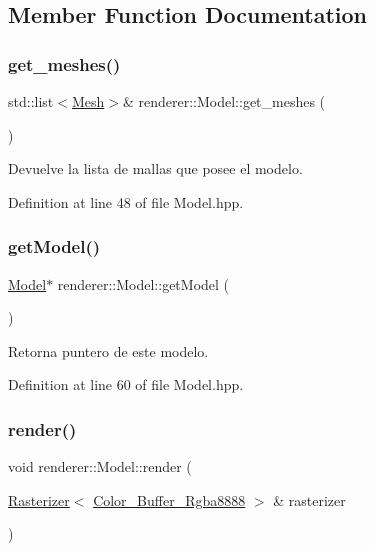 \subsection{Member Function Documentation}
\mbox{\label{classrenderer_1_1_model_a88df819cc280f518023364c9181aff64}} 
\subsubsection{\texorpdfstring{get\_meshes()}{get\_meshes()}}
{\footnotesize\ttfamily std\+::list$<$\mbox{\hyperlink{classrenderer_1_1_mesh}{Mesh}}$>$\& renderer\+::\+Model\+::get\+\_\+meshes (\begin{DoxyParamCaption}{ }\end{DoxyParamCaption})\hspace{0.3cm}{\ttfamily [inline]}}

Devuelve la lista de mallas que posee el modelo. 

Definition at line 48 of file Model.\+hpp.

\mbox{\label{classrenderer_1_1_model_a2e81d98304670f47465b18010ec342cb}} 
\subsubsection{\texorpdfstring{getModel()}{getModel()}}
{\footnotesize\ttfamily \mbox{\hyperlink{classrenderer_1_1_model}{Model}}$\ast$ renderer\+::\+Model\+::get\+Model (\begin{DoxyParamCaption}{ }\end{DoxyParamCaption})\hspace{0.3cm}{\ttfamily [inline]}}

Retorna puntero de este modelo. 

Definition at line 60 of file Model.\+hpp.

\mbox{\label{classrenderer_1_1_model_aa244954142032d5aaed2d17585fe6a91}} 
\subsubsection{\texorpdfstring{render()}{render()}}
{\footnotesize\ttfamily void renderer\+::\+Model\+::render (\begin{DoxyParamCaption}\item[{\mbox{\hyperlink{classrenderer_1_1_rasterizer}{Rasterizer}}$<$ \mbox{\hyperlink{classrenderer_1_1_color___buffer___rgba8888}{Color\+\_\+\+Buffer\+\_\+\+Rgba8888}} $>$ \&}]{rasterizer }\end{DoxyParamCaption})\hspace{0.3cm}{\ttfamily [inline]}}



